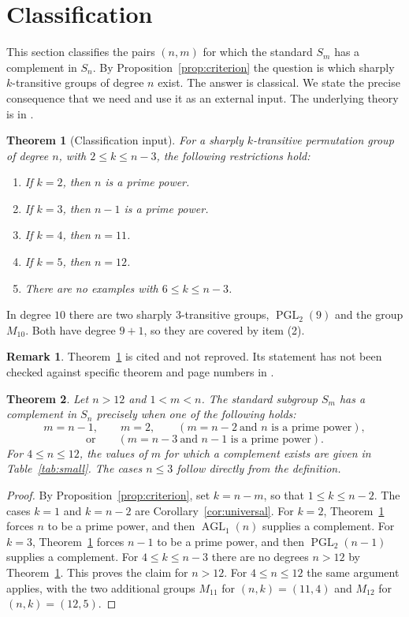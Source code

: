 \documentclass[12pt,letterpaper]{article}
\numberwithin{equation}{section}
\newtheorem{theorem}{Theorem}[section]
\theoremstyle{definition}
\newtheorem{vremark}{Remark}
\DeclareMathOperator{\agll}{AGL}
\DeclareMathOperator{\pgll}{PGL}
\begin{document}
\section{Classification}\label{sec:classification}
This section classifies the pairs $(n,m)$ for which the standard $S_m$ has a complement in $S_n$. By Proposition~\ref{prop:criterion} the question is which sharply $k$-transitive groups of degree $n$ exist. The answer is classical. We state the precise consequence that we need and use it as an external input. The underlying theory is in \cite{Ca99,DM96}.
\begin{theorem}[Classification input]\label{thm:input}
For a sharply $k$-transitive permutation group of degree $n$, with $2\leq k\leq n-3$, the following restrictions hold:
\begin{enumerate}
\item If $k=2$, then $n$ is a prime power.
\item If $k=3$, then $n-1$ is a prime power.
\item If $k=4$, then $n=11$.
\item If $k=5$, then $n=12$.
\item There are no examples with $6\leq k\leq n-3$.
\end{enumerate}
\end{theorem}
In degree $10$ there are two sharply $3$-transitive groups, $\pgll_2(9)$ and the group $M_{10}$. Both have degree $9+1$, so they are covered by item (2).
\begin{vremark}\label{rem:input}
Theorem~\ref{thm:input} is cited and not reproved. Its statement has not been checked against specific theorem and page numbers in \cite{Ca99,DM96}.
\end{vremark}
\begin{theorem}\label{thm:main}
Let $n>12$ and $1<m<n$. The standard subgroup $S_m$ has a complement in $S_n$ precisely when one of the following holds:
\[
m=n-1,\qquad m=2,\qquad
(m=n-2\ \text{and }n\text{ is a prime power}),
\]
\[
\text{or}\qquad (m=n-3\ \text{and }n-1\text{ is a prime power}).
\]
For $4\leq n\leq12$, the values of $m$ for which a complement exists are given in Table~\ref{tab:small}. The cases $n\leq3$ follow directly from the definition.
\end{theorem}
\begin{proof}
By Proposition~\ref{prop:criterion}, set $k=n-m$, so that $1\leq k\leq n-2$. The cases $k=1$ and $k=n-2$ are Corollary~\ref{cor:universal}. For $k=2$, Theorem~\ref{thm:input} forces $n$ to be a prime power, and then $\agll_1(n)$ supplies a complement. For $k=3$, Theorem~\ref{thm:input} forces $n-1$ to be a prime power, and then $\pgll_2(n-1)$ supplies a complement. For $4\leq k\leq n-3$ there are no degrees $n>12$ by Theorem~\ref{thm:input}. This proves the claim for $n>12$. For $4\leq n\leq 12$ the same argument applies, with the two additional groups $M_{11}$ for $(n,k)=(11,4)$ and $M_{12}$ for $(n,k)=(12,5)$.
\end{proof}
\end{document}
